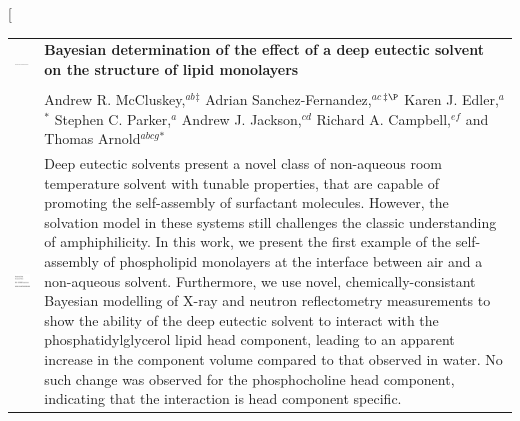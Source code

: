 \documentclass[twoside,twocolumn,9pt]{article}
\begin{document}
\twocolumn[
  \begin{@twocolumnfalse}
\vspace{3cm}
\sffamily
\begin{tabular}{m{4.5cm} p{13.5cm} }

\includegraphics{head_foot/DOI} & \noindent\LARGE{\textbf{Bayesian determination of the effect of a deep eutectic solvent on the structure of lipid monolayers}} \\%
\vspace{0.3cm} & \vspace{0.3cm} \\

 & \noindent\large{Andrew R. McCluskey,\textit{$^{ab}$}$^{\ddag}$ Adrian Sanchez-Fernandez,\textit{$^{ac}$}$^{\ddag\P}$ Karen J. Edler,\textit{$^{a}$}$^{\ast}$ Stephen C. Parker,\textit{$^{a}$} Andrew J. Jackson,\textit{$^{cd}$} Richard A. Campbell,\textit{$^{ef}$} and Thomas Arnold\textit{$^{abcg}$}$^{\ast}$} \\%

\includegraphics{head_foot/dates} & \noindent\normalsize{Deep eutectic solvents present a novel class of non-aqueous room temperature solvent with tunable properties, that are capable of promoting the self-assembly of surfactant molecules. However, the solvation model in these systems still challenges the classic understanding of amphiphilicity. In this work, we present the first example of the self-assembly of phospholipid monolayers at the interface between air and a non-aqueous solvent. Furthermore, we use novel, chemically-consistant Bayesian modelling of X-ray and neutron reflectometry measurements to show the ability of the deep eutectic solvent to interact with the phosphatidylglycerol lipid head component, leading to an apparent increase in the component volume compared to that observed in water. No such change was observed for the phosphocholine head component, indicating that the interaction is head component specific.} \\

\end{tabular}

	\end{@twocolumnfalse} \vspace{0.6cm}
\end{document}

